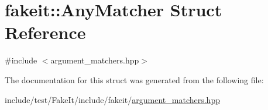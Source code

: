 \hypertarget{structfakeit_1_1AnyMatcher}{}\section{fakeit\+::Any\+Matcher Struct Reference}
\label{structfakeit_1_1AnyMatcher}


{\ttfamily \#include $<$argument\+\_\+matchers.\+hpp$>$}



The documentation for this struct was generated from the following file\+:\begin{DoxyCompactItemize}
\item 
include/test/\+Fake\+It/include/fakeit/\mbox{\hyperlink{argument__matchers_8hpp}{argument\+\_\+matchers.\+hpp}}\end{DoxyCompactItemize}
